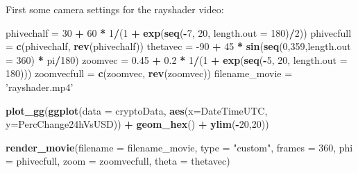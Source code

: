 \documentclass[
]{book}
\newenvironment{Shaded}{\begin{snugshade}}{\end{snugshade}}
\newcommand{\DataTypeTok}[1]{\textcolor[rgb]{0.13,0.29,0.53}{#1}}
\newcommand{\DecValTok}[1]{\textcolor[rgb]{0.00,0.00,0.81}{#1}}
\newcommand{\FloatTok}[1]{\textcolor[rgb]{0.00,0.00,0.81}{#1}}
\newcommand{\KeywordTok}[1]{\textcolor[rgb]{0.13,0.29,0.53}{\textbf{#1}}}
\newcommand{\NormalTok}[1]{#1}
\newcommand{\OperatorTok}[1]{\textcolor[rgb]{0.81,0.36,0.00}{\textbf{#1}}}
\newcommand{\StringTok}[1]{\textcolor[rgb]{0.31,0.60,0.02}{#1}}
\begin{document}
First some camera settings for the rayshader video:

\begin{Shaded}
\begin{Highlighting}[]
\NormalTok{phivechalf =}\StringTok{ }\DecValTok{30} \OperatorTok{+}\StringTok{ }\DecValTok{60} \OperatorTok{*}\StringTok{ }\DecValTok{1}\OperatorTok{/}\NormalTok{(}\DecValTok{1} \OperatorTok{+}\StringTok{ }\KeywordTok{exp}\NormalTok{(}\KeywordTok{seq}\NormalTok{(}\OperatorTok{-}\DecValTok{7}\NormalTok{, }\DecValTok{20}\NormalTok{, }\DataTypeTok{length.out =} \DecValTok{180}\NormalTok{)}\OperatorTok{/}\DecValTok{2}\NormalTok{))}
\NormalTok{phivecfull =}\StringTok{ }\KeywordTok{c}\NormalTok{(phivechalf, }\KeywordTok{rev}\NormalTok{(phivechalf))}
\NormalTok{thetavec =}\StringTok{ }\DecValTok{-90} \OperatorTok{+}\StringTok{ }\DecValTok{45} \OperatorTok{*}\StringTok{ }\KeywordTok{sin}\NormalTok{(}\KeywordTok{seq}\NormalTok{(}\DecValTok{0}\NormalTok{,}\DecValTok{359}\NormalTok{,}\DataTypeTok{length.out =} \DecValTok{360}\NormalTok{) }\OperatorTok{*}\StringTok{ }\NormalTok{pi}\OperatorTok{/}\DecValTok{180}\NormalTok{)}
\NormalTok{zoomvec =}\StringTok{ }\FloatTok{0.45} \OperatorTok{+}\StringTok{ }\FloatTok{0.2} \OperatorTok{*}\StringTok{ }\DecValTok{1}\OperatorTok{/}\NormalTok{(}\DecValTok{1} \OperatorTok{+}\StringTok{ }\KeywordTok{exp}\NormalTok{(}\KeywordTok{seq}\NormalTok{(}\OperatorTok{-}\DecValTok{5}\NormalTok{, }\DecValTok{20}\NormalTok{, }\DataTypeTok{length.out =} \DecValTok{180}\NormalTok{)))}
\NormalTok{zoomvecfull =}\StringTok{ }\KeywordTok{c}\NormalTok{(zoomvec, }\KeywordTok{rev}\NormalTok{(zoomvec))}
\NormalTok{filename_movie =}\StringTok{ 'rayshader.mp4'}
\end{Highlighting}
\end{Shaded}

\begin{Shaded}
\begin{Highlighting}[]
\KeywordTok{plot_gg}\NormalTok{(}\KeywordTok{ggplot}\NormalTok{(}\DataTypeTok{data =}\NormalTok{ cryptoData, }\KeywordTok{aes}\NormalTok{(}\DataTypeTok{x=}\NormalTok{DateTimeUTC, }\DataTypeTok{y=}\NormalTok{PercChange24hVsUSD)) }\OperatorTok{+}
\StringTok{          }\KeywordTok{geom_hex}\NormalTok{() }\OperatorTok{+}
\StringTok{          }\KeywordTok{ylim}\NormalTok{(}\OperatorTok{-}\DecValTok{20}\NormalTok{,}\DecValTok{20}\NormalTok{))}

\KeywordTok{render_movie}\NormalTok{(}\DataTypeTok{filename =}\NormalTok{ filename_movie, }\DataTypeTok{type =} \StringTok{"custom"}\NormalTok{,}
             \DataTypeTok{frames =} \DecValTok{360}\NormalTok{,  }\DataTypeTok{phi =}\NormalTok{ phivecfull, }\DataTypeTok{zoom =}\NormalTok{ zoomvecfull, }\DataTypeTok{theta =}\NormalTok{ thetavec)}
\end{Highlighting}
\end{Shaded}
\end{document}
